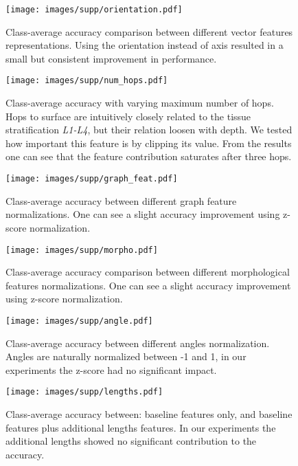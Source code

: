 \documentclass[10pt,twocolumn,letterpaper]{article}
\begin{document}
\begin{figure}
  \centering
  \texttt{[image: images/supp/orientation.pdf]}
  \caption{Class-average accuracy comparison between different vector features representations. Using the orientation instead of axis resulted in a small but consistent improvement in performance.}
  \label{fig:orientation}
\end{figure}

\begin{figure}
  \centering
  \texttt{[image: images/supp/num\_hops.pdf]}
  \caption{Class-average accuracy with varying maximum number of hops. Hops to surface are intuitively closely related to the tissue stratification \textit{L1-L4}, but their relation loosen with depth. We tested how important this feature is by clipping its value. From the results one can see that the feature contribution saturates after three hops.}
  \label{fig:hops}
\end{figure}

\begin{figure}
  \centering
  \texttt{[image: images/supp/graph\_feat.pdf]}
  \caption{Class-average accuracy between different graph feature normalizations. One can see a slight accuracy improvement using z-score normalization.}
  \label{fig:graph}
\end{figure}

\begin{figure}
  \centering
  \texttt{[image: images/supp/morpho.pdf]}
  \caption{Class-average accuracy comparison between different morphological features normalizations. One can see a slight accuracy improvement using z-score normalization.}
  \label{fig:morph}
\end{figure}

\begin{figure}
  \centering
  \texttt{[image: images/supp/angle.pdf]}
  \caption{Class-average accuracy between different angles normalization. Angles are naturally normalized between -1 and 1, in our experiments the z-score had no significant impact.}
  \label{fig:angle}
\end{figure}

\begin{figure}
  \centering
  \texttt{[image: images/supp/lengths.pdf]}
  \caption{Class-average accuracy between: baseline features only, and baseline features plus additional lengths features. In our experiments the additional lengths showed no significant contribution to the accuracy.}
  \label{fig:lengths}
\end{figure}
\end{document}
